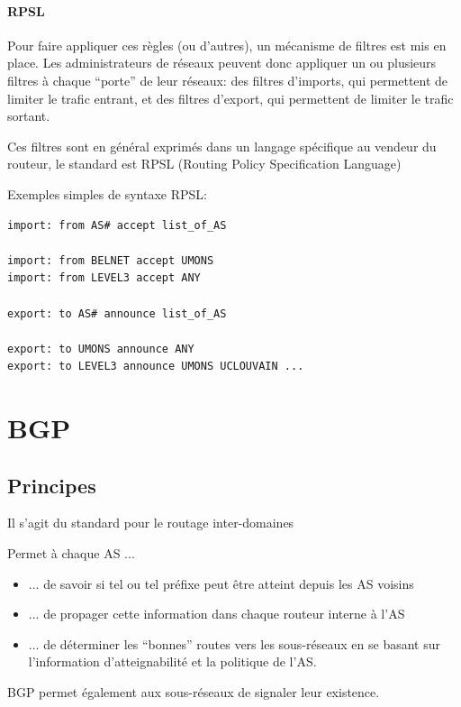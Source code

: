 \documentclass{report}
\begin{document}
\paragraph{RPSL}

Pour faire appliquer ces règles (ou d'autres), un mécanisme de filtres
est mis en place. Les administrateurs de réseaux peuvent donc
appliquer un ou plusieurs filtres à chaque ``porte'' de leur réseaux:
des filtres d'imports, qui permettent de limiter le trafic entrant, et
des filtres d'export, qui permettent de limiter le trafic sortant.

Ces filtres sont en général exprimés dans un langage spécifique au
vendeur du routeur, le standard est RPSL (Routing Policy Specification
Language)

Exemples simples de syntaxe RPSL:

\begin{verbatim}
import: from AS# accept list_of_AS

import: from BELNET accept UMONS
import: from LEVEL3 accept ANY

export: to AS# announce list_of_AS

export: to UMONS announce ANY
export: to LEVEL3 announce UMONS UCLOUVAIN ...
\end{verbatim}

\section{BGP}

\subsection{Principes}

Il s'agit du standard pour le routage inter-domaines

Permet à chaque AS ...

\begin{itemize}
\item ... de savoir si tel ou tel préfixe peut être atteint depuis les
  AS voisins
\item ... de propager cette information dans chaque routeur interne à
  l'AS
\item ... de déterminer les ``bonnes'' routes vers les sous-réseaux en
  se basant sur l'information d'atteignabilité et la politique de
  l'AS.
\end{itemize}

BGP permet également aux sous-réseaux de signaler leur existence.
\end{document}
